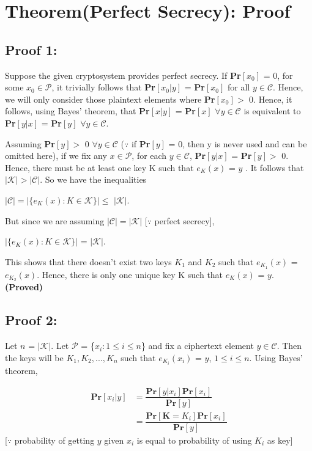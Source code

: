 \documentclass[12pt]{article}
\begin{document}
\section{Theorem(Perfect Secrecy): Proof}
\begin{large}
\subsection{Proof 1:}
Suppose the given cryptosystem provides perfect secrecy. If \textbf{Pr}$[x_0]$ = 0, for some $x_0 \in \mathcal{P}$, it trivially follows that \textbf{Pr}$[x_0|y]$ = \textbf{Pr}$[x_0]$ for all $y \in \mathcal{C}$. Hence, we will only consider those plaintext elements where \textbf{Pr}$[x_0] >$ 0. Hence, it follows, using Bayes' theorem, that \textbf{Pr}$[x|y]$ = \textbf{Pr}$[x]$ $\forall y \in \mathcal{C}$ is equivalent to \textbf{Pr}$[y|x]$ = \textbf{Pr}$[y]$ $\forall y \in \mathcal{C}$.

Assuming \textbf{Pr}$[y] >$ 0 $\forall y \in \mathcal{C}$ ($\because$ if \textbf{Pr}$[y]$ = 0, then y is never used and can be omitted here), if we fix any $x \in \mathcal{P}$, for each $y \in \mathcal{C}$, \textbf{Pr}$[y|x]$ = \textbf{Pr}$[y] >$ 0. Hence, there must be at least one key K such that $e_K(x)$ = $y$ . It follows that $|\mathcal{K}| > |\mathcal{C}|$. So we have the inequalities
\begin{center}
$|\mathcal{C}| = |\{e_K(x):K \in \mathcal{K}\}| \le$ $|\mathcal{K}|$.
\end{center}
But since we are assuming $|\mathcal{C}| = |\mathcal{K}|$ [$\because$ perfect secrecy],
\begin{center}
$|\{e_K(x):K \in \mathcal{K}\}|$ = $|\mathcal{K}|$.
\end{center}
This shows that there doesn't exist two keys $K_1$ and $K_2$ such that $e_{K_1}(x)$ = $e_{K_2}(x)$. Hence, there is only one unique key K such that $e_K(x)$ = $y$. \textbf{(Proved)}

\subsection{Proof 2:}
Let $n$ = $|\mathcal{K}|$. Let $\mathcal{P}$ = \{$x_i:1 \le i \le n$\} and fix a ciphertext element $y \in \mathcal{C}$. Then the keys will be $K_1, K_2,...,K_n$ such that $e_{K_i}(x_i)$ = $y$, $1 \le i \le n$. Using Bayes' theorem,

\begin{align*}
\textbf{Pr}[x_i|y] &= \dfrac{\textbf{Pr}[y|x_i]\textbf{Pr}[x_i]}{\textbf{Pr}[y]}\\
& = \dfrac{\textbf{Pr}[\textbf{K} = K_i]\textbf{Pr}[x_i]}{\textbf{Pr}[y]}
\end{align*}
[$\because$ probability of getting $y$ given $x_i$ is equal to probability of using $K_i$ as key]


\end{large}
\end{document}
